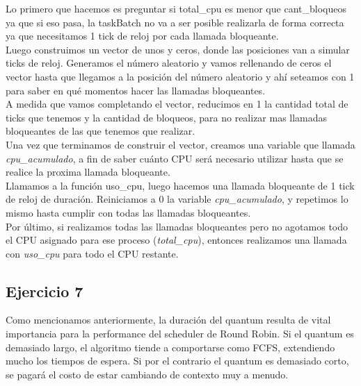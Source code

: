 Lo primero que hacemos es preguntar si total\_cpu es menor que cant\_bloqueos ya que si eso pasa,
la taskBatch no va a ser posible realizarla de forma correcta ya que necesitamos 1 tick de reloj por
cada llamada bloqueante. \\

Luego construimos un vector de unos y ceros, donde las posiciones van a simular ticks de reloj.
Generamos el número aleatorio y vamos rellenando de ceros el vector hasta que llegamos a la
posición del número aleatorio y ahí seteamos con 1 para saber en qu\'e momentos hacer las llamadas
bloqueantes. \\

A medida que vamos completando el vector, reducimos en 1 la cantidad total de ticks que tenemos
y la cantidad de bloqueos, para no realizar mas llamadas bloqueantes de las que tenemos que
realizar. \\

Una vez que terminamos de construir el vector, creamos una variable que llamada
\textit{cpu\_acumulado}, a fin de saber cu\'anto CPU ser\'a necesario utilizar hasta que se realice la proxima llamada bloqueante. \\

Llamamos a la función uso\_cpu, luego hacemos una llamada bloqueante de 1 tick de reloj de duraci\'on. Reiniciamos a 0 la variable \textit{cpu\_acumulado}, y repetimos lo mismo hasta cumplir con todas las llamadas bloqueantes. \\

Por último, si realizamos todas las llamadas bloqueantes pero no agotamos todo el CPU asignado para ese proceso (\textit{total\_cpu}), entonces realizamos una llamada con \textit{uso\_cpu} para todo el CPU restante.\\


\subsection{Ejercicio 7}

Como mencionamos anteriormente, la duración del quantum resulta de vital importancia para la performance del scheduler de Round Robin. Si el quantum es demasiado largo, el algoritmo tiende a comportarse como FCFS, extendiendo mucho los tiempos de espera. Si por el contrario el quantum es demasiado corto, se pagará el costo de estar cambiando de contexto muy a menudo.\\

